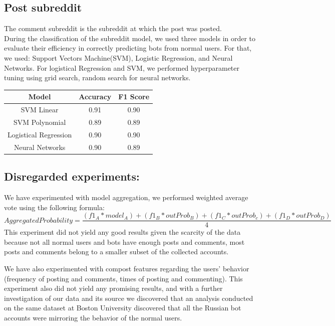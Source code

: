 \documentclass{article}
\begin{document}
    \subsection{Post subreddit}  
    
        The comment subreddit is the subreddit at which the post was posted. \\
    During the classification of  the subreddit model, we used three models in order to evaluate their efficiency in correctly predicting bots from normal users. For that, we used: Support Vectors Machine(SVM), Logistic Regression, and Neural Networks.
For logistical Regression and SVM, we performed hyperparameter tuning using grid search, random search for neural networks.

        \begin{center}
    \begin{tabular}{|c || c| c|} 
     \hline
     Model & Accuracy  & F1 Score  \\ [0.5ex] 
     \hline\hline
     SVM Linear & 0.91  & 0.90 \\ 
     \hline
     SVM Polynomial & 0.89 &0.89 \\
     \hline
     Logistical Regression & 0.90 & 0.90  \\ 
     \hline
     Neural Networks & 0.90  & 0.89\\
     \hline

    \end{tabular}
    \end{center}  
    
            \subsection{Disregarded experiments:}
        We have experimented with model aggregation, we performed weighted average vote using the following formula:
        $$AggregatedProbability = \frac{(f1_A * model_A) 
                                    + (f1_B * outProb_B) 
                                    + (f1_C * outProb_c) 
                                    + (f1_D * outProb_D)}{4}$$
        This experiment did not yield any good results given the scarcity of the data because not all normal users and bots have enough posts and comments, most posts and comments belong to a smaller subset of the collected accounts.\par
        We have also experimented with compost features regarding the users' behavior (frequency of posting and comments, times of posting and commenting). This experiment also did not yield any promising results, and with a further investigation of our data and its source we discovered that an analysis conducted on the same dataset at Boston University discovered that all the Russian bot accounts were mirroring the behavior of the normal users.\par
\end{document}
